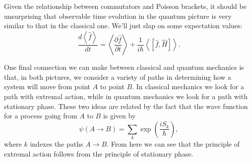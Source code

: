 \documentclass[../p111main.tex]{subfiles}
\begin{document}
Given the relationship between commutators and Poisson brackets, it should be unsurprising that observable time evolution in the quantum picture is very similar to that in the classical one.
We'll just slap on some expectation values:
\[ \frac{d \left< \hat f \right>}{dt} = \left< \frac{\partial \hat f}{\partial t} \right> + \frac{1}{i\hbar} \left< [\hat f, \hat H] \right>. \]

One final connection we can make between classical and quantum mechanics is that, in both pictures, we consider a variety of paths in determining how a system will move from point $A$ to point $B$.
In classical mechanics we look for a path with extremal action, while in quantum mechanics we look for a path with stationary phase.
These two ideas are related by the fact that the wave function for a process going from $A$ to $B$ is given by
\[ \psi(A \to B) = \sum_{k}^{} \exp \left( \frac{i S_k}{\hbar} \right), \]
where $k$ indexes the paths $A \to B$.
From here we can see that the principle of extremal action follows from the principle of stationary phase.
\end{document}
